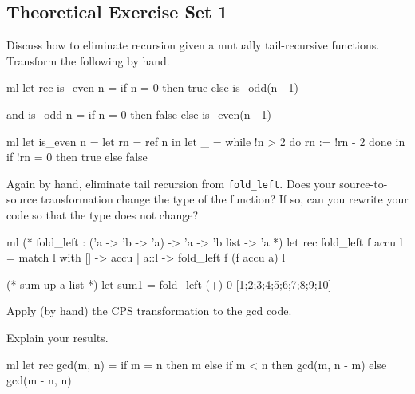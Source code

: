 \documentclass{supervision}
\begin{document}
  \begin{questions}
    \section*{Theoretical Exercise Set 1}
    \question Discuss how to eliminate recursion given a mutually
      tail-recursive functions. Transform the following by hand.

      \begin{code}{ml}
        let rec is_even n =
            if n = 0
            then true
            else is_odd(n - 1)

        and is_odd n =
            if n = 0
            then false
            else is_even(n - 1)
      \end{code}

      \begin{solution}
        \begin{code}{ml}
          let is_even n =
              let rn = ref n
              in let _ = while !n > 2
                do
                  rn := !rn - 2
                done
              in if !rn = 0
                 then true
                 else false

        \end{code}
      \end{solution}

    \question Again by hand, eliminate tail recursion from
      \lstinline|fold_left|. Does your source-to-source transformation change
      the type of the function? If so, can you rewrite your code so that the
      type does not change?

      \begin{code}{ml}
        (* fold_left : ('a -> 'b -> 'a) -> 'a -> 'b list -> 'a *)
        let rec fold_left f accu l =
          match l with
              [] -> accu
          | a::l -> fold_left f (f accu a) l

        (* sum up a list *)
        let sum1 = fold_left (+) 0 [1;2;3;4;5;6;7;8;9;10]
      \end{code}

    \question Apply (by hand) the CPS transformation to the gcd code.

      Explain your results.

      \begin{code}{ml}
        let rec gcd(m, n) =
            if m = n
            then m
            else if m < n
                then gcd(m, n - m)
                else gcd(m - n, n)


\end{code}
\end{questions}
\end{document}
